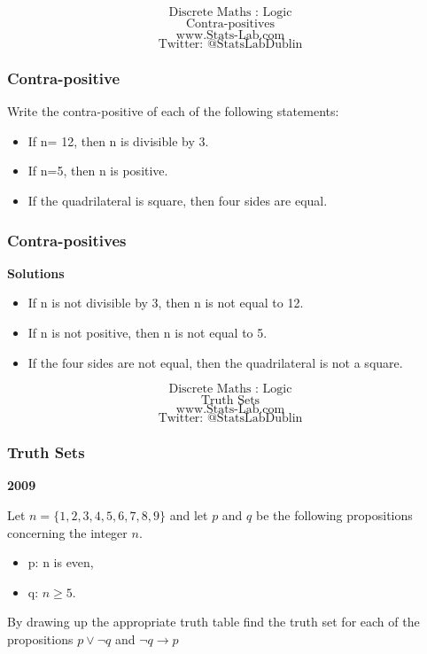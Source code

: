 \documentclass{beamer}
\begin{document}
\begin{frame}
\Huge
\[\mbox{Discrete Maths :  Logic}\]
\[\mbox{Contra-positives}\]
\bigskip
\LARGE
\[\mbox{www.Stats-Lab.com}\]
\[\mbox{Twitter: @StatsLabDublin}\]
\end{frame}


\begin{frame}
\frametitle{Contra-positive}
\Large
Write the contra-positive of each of the following statements:

\begin{itemize}
\item If n= 12, then n is divisible by 3.
\item If n=5, then n is positive.
\item If the quadrilateral is square, then four sides are equal.
\end{itemize}
\end{frame}
\begin{frame}
\frametitle{Contra-positives}
\Large
\textbf{Solutions}
\begin{itemize}
\item If n is not divisible by 3, then n is not equal to 12.
\item If n is not positive, then n is not equal to 5.
\item If the four sides are not equal, then the quadrilateral is not a square.
\end{itemize}
\end{frame}

\begin{frame}
\Huge
\[\mbox{Discrete Maths :  Logic}\]
\[\mbox{Truth Sets}\]
\bigskip
\LARGE
\[\mbox{www.Stats-Lab.com}\]
\[\mbox{Twitter: @StatsLabDublin}\]
\end{frame}


\begin{frame}
\frametitle{Truth Sets}
\Large

\textbf{2009} 

Let $n = \{1, 2,3,4, 5,6,7, 8, 9\}$ and let $p$ and  $q$ be the following propositions concerning the integer $n$.
\begin{itemize}
\item p: n is even, 
\item q: $n\geq 5$.
\end{itemize}
By drawing up the appropriate truth table ﬁnd the truth set for each of the
propositions $p \vee \neg q$ and $ \neg q \rightarrow p$
\end{frame}
\end{document}
